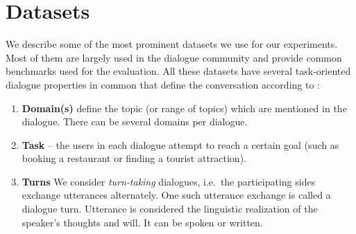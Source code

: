 \section{Datasets}
\label{02:sec:input-data-desc}
We describe some of the most prominent datasets we use for our experiments.
Most of them are largely used in the dialogue community and provide common benchmarks used for the evaluation.
All these datasets have several task-oriented dialogue properties in common that define the conversation according to \cite{young_pomdp-based_2013}:
\begin{enumerate}
\item \textbf{Domain(s)} define the topic (or range of topics) which are mentioned in the dialogue. There can be several domains per dialogue.
\item \textbf{Task} -- the users in each dialogue attempt to reach a certain goal (such as booking a restaurant or finding a tourist attraction).
\item \textbf{Turns} We consider \emph{turn-taking} dialogues, i.e.\ the participating sides exchange utterances alternately.
One such utterance exchange is called a dialogue turn.
Utterance is considered the linguistic realization of the speaker's thoughts and will. It can be spoken or written. 


\end{enumerate}
